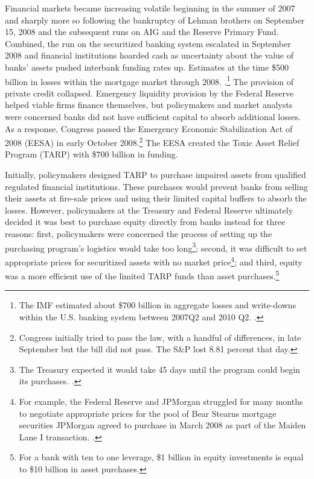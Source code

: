 \documentclass[12pt]{article}
\begin{document}
Financial markets became increasing volatile beginning in the summer of 2007 and sharply more so following the bankruptcy of Lehman brothers on September 15, 2008 and the subsequent runs on AIG and the Reserve Primary Fund. Combined, the run on the securitized banking system escalated in September 2008 and financial institutions hoarded cash as uncertainty about the value of banks' assets pushed interbank funding rates up. Estimates at the time \$500 billion in losses within the mortgage market through 2008. \citep{Greenlaw}.\footnote{The IMF estimated about \$700 billion in aggregate losses and write-downs within the U.S. banking system between 2007Q2 and 2010 Q2. \citep{IMF2010}.} The provision of private credit collapsed. Emergency liquidity provision by the Federal Reserve helped viable firms finance themselves, but policymakers and market analysts were concerned banks did not have sufficient capital to absorb additional losses. As a response, Congress passed the Emergency Economic Stabilization Act of 2008 (EESA) in early October 2008.\footnote{Congress initially tried to pass the law, with a handful of differences, in late September but the bill did not pass. The S\&P lost 8.81 percent that day.} The EESA created the Toxic Asset Relief Program (TARP) with \$700 billion in funding.

Initially, policymakers designed TARP to purchase impaired assets from qualified regulated financial institutions. These purchases would prevent banks from selling their assets at fire-sale prices and using their limited capital buffers to absorb the losses. However, policymakers at the Treasury and Federal Reserve ultimately decided it was best to purchase equity directly from banks instead for three reasons: first, policymakers were concerned the process of setting up the purchasing program's logistics would take too long\footnote{The Treasury expected it would take 45 days until the program could begin its purchases. \citep{Geithner}.}; second, it was difficult to set appropriate prices for securitized assets with no market price\footnote{For example, the Federal Reserve and JPMorgan struggled for many months to negotiate appropriate prices for the pool of Bear Stearns mortgage securities JPMorgan agreed to purchase in March 2008 as part of the Maiden Lane I transaction. \citep{Geithner}.}; and third, equity was a more efficient use of the limited TARP funds than asset purchases.\footnote{For a bank with ten to one leverage, \$1 billion in equity investments is equal to \$10 billion in asset purchases.}
\end{document}
